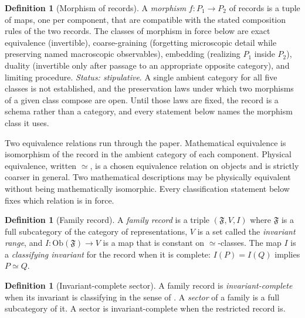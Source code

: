 \documentclass[11pt,letterpaper]{article}
\theoremstyle{definition}
\newtheorem{definition}[theorem]{Definition}
\theoremstyle{remark}
\begin{document}
\begin{definition}[Morphism of records]
\label{def:morphism}
A \emph{morphism} $f \colon P_1 \to P_2$ of records is a tuple of maps, one per component, that are compatible with the stated composition rules of the two records. The classes of morphism in force below are exact equivalence (invertible), coarse-graining (forgetting microscopic detail while preserving named macroscopic observables), embedding (realizing $P_1$ inside $P_2$), duality (invertible only after passage to an appropriate opposite category), and limiting procedure. \emph{Status: stipulative}. A single ambient category for all five classes is not established, and the preservation laws under which two morphisms of a given class compose are open. Until those laws are fixed, the record is a schema rather than a category, and every statement below names the morphism class it uses.
\end{definition}

Two equivalence relations run through the paper. Mathematical equivalence is isomorphism of the record in the ambient category of each component. Physical equivalence, written $\simeq$, is a chosen equivalence relation on objects and is strictly coarser in general. Two mathematical descriptions may be physically equivalent without being mathematically isomorphic. Every classification statement below fixes which relation is in force.

\begin{definition}[Family record]
\label{def:family-record}
A \emph{family record} is a triple $(\mathfrak{F}, V, I)$ where $\mathfrak{F}$ is a full subcategory of the category of representations, $V$ is a set called the \emph{invariant range}, and $I \colon \mathrm{Ob}(\mathfrak{F}) \to V$ is a map that is constant on $\simeq$-classes. The map $I$ is a \emph{classifying invariant} for the record when it is complete: $I(P) = I(Q)$ implies $P \simeq Q$.
\end{definition}

\begin{definition}[Invariant-complete sector]
\label{def:sector}
A family record is \emph{invariant-complete} when its invariant is classifying in the sense of . A \emph{sector} of a family is a full subcategory of it. A sector is invariant-complete when the restricted record is.
\end{definition}
\end{document}
